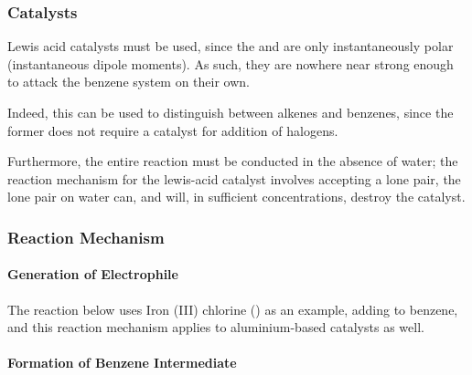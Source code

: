 				\hypertarget{BenzeneHalogenationCatalyst}{}
				\subsubsection{Catalysts}

					Lewis acid catalysts must be used, since the  and \ch{\chlorine-\chlorine} are only instantaneously polar (instantaneous
					dipole moments). As such, they are nowhere near strong enough to attack the benzene system on their own.

					Indeed, this can be used to distinguish between alkenes and benzenes, since the former does not require a catalyst for addition
					of halogens.

					Furthermore, the entire reaction must be conducted in the absence of water; the reaction mechanism for the lewis-acid catalyst
					involves accepting a lone pair, the lone pair on water can, and will, in sufficient concentrations, destroy the catalyst.




				\subsubsection{Reaction Mechanism}

					\paragraph{Generation of Electrophile}

					The reaction below uses Iron (III) chlorine () as an example, adding \ch{\chlorine} to benzene,
					and this reaction mechanism applies to aluminium-based catalysts as well.



					\pagebreak

					\paragraph{Formation of Benzene Intermediate}

